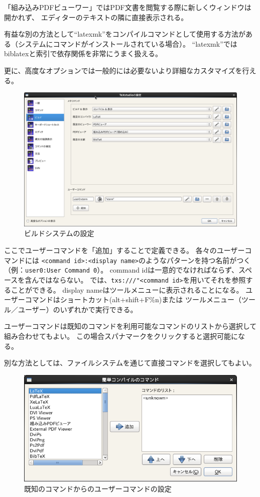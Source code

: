 「組み込みPDFビューワー」ではPDF文書を閲覧する際に新しくウィンドウは開かれず、
エディターのテキストの隣に直接表示される。

有益な別の方法として``latexmk''をコンパイルコマンドとして使用する方法がある（システムにコマンドがインストールされている場合）。
``latexmk''ではbiblatexと索引で依存関係を非常にうまく扱える。

更に、高度なオプションでは一般的には必要ないより詳細なカスタマイズを行える。

\begin{figure}[H]
  \centering
  \includegraphics[width=.8\linewidth]{configure_build.png}
  \caption{ビルドシステムの設定}
\end{figure}

ここでユーザーコマンドを「追加」することで定義できる。
各々のユーザーコマンドには
\verb+<command id>:<display name>+のようなパターンを持つ名前がつく
（例：\verb+user0:User Command 0+）。
command idは一意的でなければならず、スペースを含んではならない。
では、\verb+txs:///"<command id>+を用いてそれを参照することができる。
display nameはツールメニューに表示されることになる。
ユーザーコマンドはショートカット(alt+shift+F\%n)または
ツールメニュー（ツール／ユーザー）のいずれかで実行できる。

ユーザーコマンドは既知のコマンドを利用可能なコマンドのリストから選択して組み合わせてもよい。
この場合スパナマークをクリックすると選択可能になる。

別な方法としては、ファイルシステムを通じて直接コマンドを選択してもよい。

\begin{figure}[H]
  \centering
  \includegraphics[width=.8\linewidth]{doc21.png}
  \caption{既知のコマンドからのユーザーコマンドの設定}
\end{figure}

